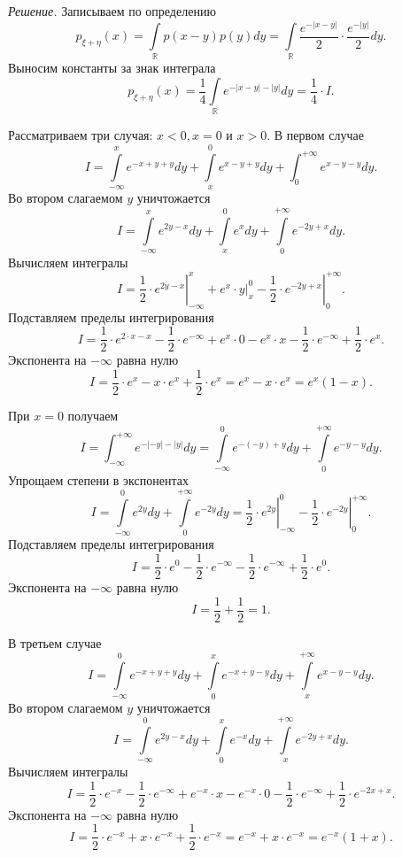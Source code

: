 \textit{Решение.} Записываем по определению
$$p_{ \xi + \eta } \left( x \right) =
\int \limits_{ \mathbb{R}} p \left( x-y \right) p \left( y \right) dy =
\int \limits_{ \mathbb{R}} \frac{e^{- \left| x-y \right| }}{2} \cdot \frac{e^{- \left| y \right| }}{2} dy.$$
Выносим константы за знак интеграла
$$p_{ \xi + \eta } \left( x \right) =
\frac{1}{4} \int \limits_{ \mathbb{R}} e^{- \left| x-y \right| - \left| y \right| } dy =
\frac{1}{4} \cdot I.$$

Рассматриваем три случая: $x < 0, x = 0$ и $x > 0$.
В первом случае
$$I =
\int \limits_{- \infty }^x e^{-x+y+y} dy + \int \limits_x^0 e^{x-y+y} dy + \int_0^{+ \infty } e^{x-y-y} dy.$$
Во втором слагаемом $y$ уничтожается
$$I =
\int \limits_{- \infty }^x e^{2y-x} dy + \int \limits_x^0 e^x dy + \int \limits_0^{+ \infty } e^{-2y+x} dy.$$
Вычисляем интегралы
$$I =
\left. \frac{1}{2} \cdot e^{2y-x} \right|_{- \infty }^x + \left. e^x \cdot y \right|_x^0 - \left. \frac{1}{2} \cdot e^{-2y+x} \right|_0^{+ \infty }.$$
Подставляем пределы интегрирования
$$I =
\frac{1}{2} \cdot e^{2 \cdot x - x} - \frac{1}{2} \cdot e^{- \infty } + e^x \cdot 0 - e^x \cdot x - \frac{1}{2} \cdot e^{- \infty } + \frac{1}{2} \cdot e^x.$$
Экспонента на $- \infty $ равна нулю
$$I =
\frac{1}{2} \cdot e^x - x \cdot e^x + \frac{1}{2} \cdot e^x =
e^x - x \cdot e^x =
e^x \left( 1 - x \right).$$

При $x = 0$ получаем
$$I =
\int_{- \infty }^{+ \infty } e^{- \left| -y \right| - \left| y \right| } dy =
\int \limits_{- \infty }^0 e^{- \left( -y \right) + y} dy + \int \limits_0^{+ \infty } e^{-y-y} dy.$$
Упрощаем степени в экспонентах
$$I =
\int \limits_{- \infty }^0 e^{2y} dy + \int \limits_0^{+ \infty } e^{-2y} dy =
\left. \frac{1}{2} \cdot e^{2y} \right|_{- \infty }^0 - \left. \frac{1}{2} \cdot e^{-2y} \right|_0^{+ \infty }.$$
Подставляем пределы интегрирования
$$I =
\frac{1}{2} \cdot e^0 - \frac{1}{2} \cdot e^{- \infty } - \frac{1}{2} \cdot e^{- \infty } + \frac{1}{2} \cdot e^0.$$
Экспонента на $- \infty $ равна нулю
$$I =
\frac{1}{2} + \frac{1}{2} =
1.$$

В третьем случае
$$I =
\int \limits_{- \infty }^0 e^{-x+y+y} dy + \int \limits_0^x e^{-x+y-y} dy + \int \limits_x^{+ \infty } e^{x-y-y} dy.$$
Во втором слагаемом $y$ уничтожается
$$I =
\int \limits_{- \infty }^0 e^{2y-x} dy + \int \limits_0^x e^{-x} dy + \int \limits_x^{+ \infty } e^{-2y+x} dy.$$
Вычисляем интегралы
$$I =
\frac{1}{2} \cdot e^{-x} - \frac{1}{2} \cdot e^{- \infty } + e^{-x} \cdot x - e^{-x} \cdot 0 - \frac{1}{2} \cdot e^{- \infty } + \frac{1}{2} \cdot e^{-2x+x}.$$
Экспонента на $- \infty $ равна нулю
$$I =
\frac{1}{2} \cdot e^{-x} + x \cdot e^{-x} + \frac{1}{2} \cdot e^{-x} =
e^{-x} + x \cdot e^{-x} =
e^{-x} \left( 1+x \right).$$

